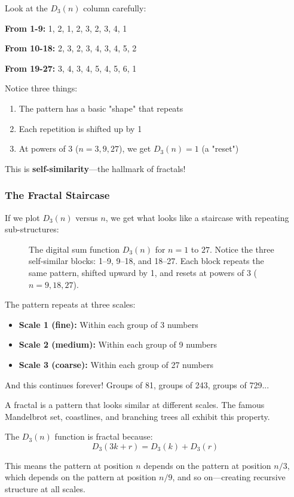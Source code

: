 \begin{intuitive}
Look at the $D_3(n)$ column carefully:

\textbf{From 1-9:} 1, 2, 1, 2, 3, 2, 3, 4, 1

\textbf{From 10-18:} 2, 3, 2, 3, 4, 3, 4, 5, 2

\textbf{From 19-27:} 3, 4, 3, 4, 5, 4, 5, 6, 1

Notice three things:
\begin{enumerate}
\item The pattern has a basic "shape" that repeats
\item Each repetition is shifted up by 1
\item At powers of 3 ($n = 3, 9, 27$), we get $D_3(n) = 1$ (a "reset")
\end{enumerate}

This is \textbf{self-similarity}—the hallmark of fractals!
\end{intuitive}

\subsubsection*{The Fractal Staircase}

If we plot $D_3(n)$ versus $n$, we get what looks like a staircase with repeating sub-structures:

\begin{figure}[h]
\centering

\caption{The digital sum function $D_3(n)$ for $n = 1$ to $27$. Notice the three self-similar blocks: 1--9, 9--18, and 18--27. Each block repeats the same pattern, shifted upward by 1, and resets at powers of 3 ($n = 9, 18, 27$).}
\label{fig:d3pattern}
\end{figure}

The pattern repeats at three scales:
\begin{itemize}
\item \textbf{Scale 1 (fine):} Within each group of 3 numbers
\item \textbf{Scale 2 (medium):} Within each group of 9 numbers  
\item \textbf{Scale 3 (coarse):} Within each group of 27 numbers
\end{itemize}

And this continues forever! Groups of 81, groups of 243, groups of 729...

\begin{keyidea}
A fractal is a pattern that looks similar at different scales. The famous Mandelbrot set, coastlines, and branching trees all exhibit this property.

The $D_3(n)$ function is fractal because:
$$D_3(3k + r) = D_3(k) + D_3(r)$$

This means the pattern at position $n$ depends on the pattern at position $n/3$, which depends on the pattern at position $n/9$, and so on—creating recursive structure at all scales.
\end{keyidea}

